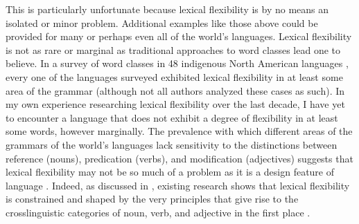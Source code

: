 This is particularly unfortunate because lexical flexibility is by no means an isolated or minor problem. Additional examples like those above could be provided for many or perhaps even all of the world's languages. Lexical flexibility is not as rare or marginal as traditional approaches to word classes lead one to believe. In a survey of word classes in 48 indigenous North American languages , every one of the languages surveyed exhibited lexical flexibility in at least some area of the grammar (although not all authors analyzed these cases as such). In my own experience researching lexical flexibility over the last decade, I have yet to encounter a language that does not exhibit a degree of flexibility in at least some words, however marginally. The prevalence with which different areas of the grammars of the world's languages lack sensitivity to the distinctions between reference (nouns), predication (verbs), and modification (adjectives) suggests that lexical flexibility may not be so much of a problem as it is a design feature of language . Indeed, as discussed in , existing research shows that lexical flexibility is constrained and shaped by the very principles that give rise to the crosslinguistic categories of noun, verb, and adjective in the first place .
